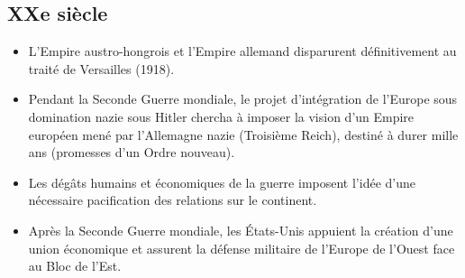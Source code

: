 \documentclass{report}%
\begin{document}
\subsection{XXe siècle}
	\begin{itemize}
		\item L’Empire austro-hongrois et l’Empire allemand disparurent définitivement au traité de Versailles (1918).
		\item Pendant la Seconde Guerre mondiale, le projet d'intégration de l'Europe sous domination nazie sous Hitler chercha à imposer la vision d'un Empire européen mené par l'Allemagne nazie (Troisième Reich), destiné à durer mille ans (promesses d'un Ordre nouveau).
		\item Les dégâts humains et économiques de la guerre imposent l'idée d'une nécessaire pacification des relations sur le continent.
		\item Après la Seconde Guerre mondiale, les États-Unis appuient la création d'une union économique et assurent la défense militaire de l'Europe de l'Ouest face au Bloc de l'Est.
	\end{itemize}
\end{document}
